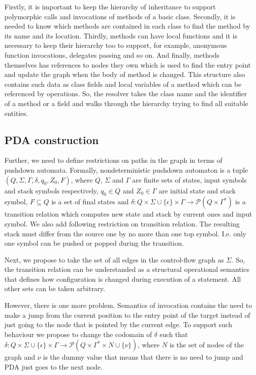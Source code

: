 Firstly, it is important to keep the hierarchy of inheritance to support polymorphic calls and invocations of methods of a basic class.
Secondly, it is needed to know which methods are contained in each class to find the method by its name and its location.
Thirdly, methods can have local functions and it is necessary to keep their hierarchy too to support, for example, anonymous function invocations, delegates passing and so on.
And finally, methods themselves has references to nodes they own which is used to find the entry point and update the graph when the body of method is changed.
This structure also contains such data as class fields and local variables of a method which can be referenced by operations.
So, the resolver takes the class name and the identifier of a method or a field and walks through the hierarchy trying to find all suitable entities.

\subsection{PDA construction}

Further, we need to define restrictions on paths in the graph in terms of pushdown automata.
Formally, nondeterministic pushdown automaton is a tuple $(Q, \Sigma, \Gamma, \delta, q_0, Z_0, F)$, where $Q$, $\Sigma$ and $\Gamma$ are finite sets of states, input symbols and stack symbols respectively, $q_0 \in Q$ and $Z_0 \in \Gamma$ are initial state and stack symbol, $F \subseteq Q$ is a set of final states and $\delta: Q \times \Sigma \cup \{\epsilon\} \times \Gamma \rightarrow \mathcal P (Q \times \Gamma^*)$ is a transition relation which computes new state and stack by current ones and input symbol.
We also add following restriction on transition relation.
The resulting stack must differ from the source one by no more than one top symbol. I.e. only one symbol can be pushed or popped during the transition.

Next, we propose to take the set of all edges in the control-flow graph as $\Sigma$.
So, the transition relation can be understanded as a structural operational semantics that defines how configuration is changed during execution of a statement.
All other sets can be taken arbitrary.

However, there is one more problem.
Semantics of invocation contains the need to make a jump from the current position to the entry point of the target instead of just going to the node that is pointed by the current edge.
To support such behaviour we propose to change the codomain of $\delta$ such that $\delta: Q \times \Sigma \cup \{\epsilon\} \times \Gamma \rightarrow \mathcal P (Q \times \Gamma^* \times N \cup \{\nu\})$, where $N$ is the set of nodes of the graph and $\nu$ is the dummy value that means that there is no need to jump and PDA just goes to the next node.

